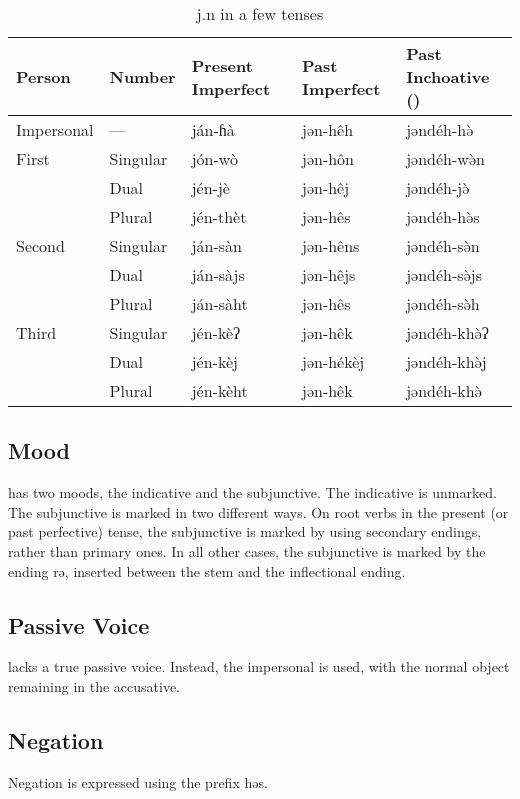 \begin{table}[h]
\centering
\caption{{\ll j.n}  in a few tenses}
\begin{tabu} to 
    \toprule
    Person & Number & \rm Present Imperfect & \rm Past Imperfect & \rm Past
    Inchoative () \\ \midrule
    Impersonal & —        & ján-ɦà   & jən-hêh   & jəndéh-hə̀   \\ \midrule
    First      & Singular & jón-wò   & jən-hôn   & jəndéh-wə̀n  \\
               & Dual     & jén-jè   & jən-hêj   & jəndéh-jə̀   \\
               & Plural   & jén-thèt & jən-hês   & jəndéh-hə̀s  \\ \midrule
    Second     & Singular & ján-sàn  & jən-hêns  & jəndéh-sə̀n  \\
               & Dual     & ján-sàjs & jən-hêjs  & jəndéh-sə̀js \\
               & Plural   & ján-sàht & jən-hês   & jəndéh-sə̀h  \\ \midrule
    Third      & Singular & jén-kèʔ  & jən-hêk   & jəndéh-khə̀ʔ \\
               & Dual     & jén-kèj  & jən-hékèj & jəndéh-khə̀j \\
               & Plural   & jén-kèht & jən-hêk   & jəndéh-khə̀  \\
    \bottomrule
\end{tabu}
\end{table}

\subsection{Mood}
\Langname{} has two moods, the indicative and the subjunctive. The indicative
is unmarked. The subjunctive is marked in two different ways. On root verbs in
the present (or past perfective) tense, the subjunctive is marked by using
secondary endings, rather than primary ones. In all other cases, the
subjunctive is marked by the ending {\ll rə}, inserted between the stem and the
inflectional ending.

\subsection{Passive Voice}
\Langname{} lacks a true passive voice. Instead, the impersonal is used, with
the normal object remaining in the accusative.

\subsection{Negation}
Negation is expressed using the prefix {\ll həs}.

